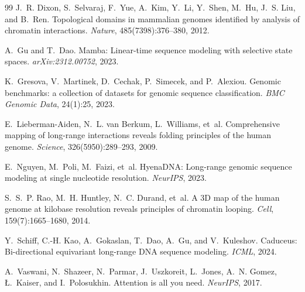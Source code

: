 \documentclass[10pt]{article}
\begin{document}
\clearpage
\small

\begin{thebibliography}{99}
J.~R. Dixon, S.~Selvaraj, F.~Yue, A.~Kim, Y.~Li, Y.~Shen, M.~Hu, J.~S. Liu, and B.~Ren.
Topological domains in mammalian genomes identified by analysis of chromatin interactions.
\emph{Nature}, 485(7398):376--380, 2012.

A.~Gu and T.~Dao.
Mamba: Linear-time sequence modeling with selective state spaces.
\emph{arXiv:2312.00752}, 2023.

K.~Gresova, V.~Martinek, D.~Cechak, P.~Simecek, and P.~Alexiou.
Genomic benchmarks: a collection of datasets for genomic sequence classification.
\emph{BMC Genomic Data}, 24(1):25, 2023.

E.~Lieberman-Aiden, N.~L. van Berkum, L.~Williams, et~al.
Comprehensive mapping of long-range interactions reveals folding principles of the human genome.
\emph{Science}, 326(5950):289--293, 2009.

E.~Nguyen, M.~Poli, M.~Faizi, et~al.
HyenaDNA: Long-range genomic sequence modeling at single nucleotide resolution.
\emph{NeurIPS}, 2023.

S.~S.~P. Rao, M.~H. Huntley, N.~C. Durand, et~al.
A 3D map of the human genome at kilobase resolution reveals principles of chromatin looping.
\emph{Cell}, 159(7):1665--1680, 2014.

Y.~Schiff, C.-H. Kao, A.~Gokaslan, T.~Dao, A.~Gu, and V.~Kuleshov.
Caduceus: Bi-directional equivariant long-range DNA sequence modeling.
\emph{ICML}, 2024.

A.~Vaswani, N.~Shazeer, N.~Parmar, J.~Uszkoreit, L.~Jones, A.~N. Gomez,
{\L}.~Kaiser, and I.~Polosukhin.
Attention is all you need.
\emph{NeurIPS}, 2017.
\end{thebibliography}
\end{document}
